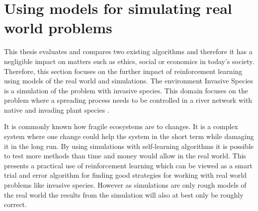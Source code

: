 \section{Using models for simulating real world problems}
\label{sec:ethics_inv_spec}

This thesis evaluates and compares two existing algorithms and therefore it has
a negligible impact on matters such as ethics, social or economics in today's
society. Therefore, this section focuses on the further impact of reinforcement learning using models of the real world and simulations. The environment Invasive Species is a simulation of the problem with invasive
species. This domain focuses on the problem where a spreading process needs to be controlled in a
river network with native and invading plant species
\parencite{invasiveSpecis2014:Online}. 

It is commonly known how fragile ecosystems are to changes. It is a complex
system where one change could help the system in the short term while damaging it in the long
run. By using simulations with self-learning algorithms it is possible to test
more methods than time and money would allow in the real world. This 
presents a practical use of reinforcement learning which can be
viewed as a smart trial and error algorithm for finding good strategies for
working with real world problems like invasive species.
However as simulations are only rough models
of the real world the results from the simulation will also at best only be roughly
correct.
